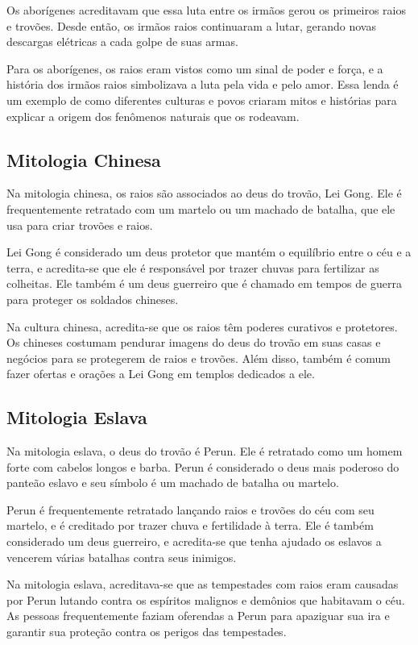 \documentclass[a4paper, 12pt, onecolumn,singlespacing]{article}
\begin{document}
	Os aborígenes acreditavam que essa luta entre os irmãos gerou os primeiros raios e trovões. Desde então, os irmãos raios continuaram a lutar, gerando novas descargas elétricas a cada golpe de suas armas.
	
	Para os aborígenes, os raios eram vistos como um sinal de poder e força, e a história dos irmãos raios simbolizava a luta pela vida e pelo amor. Essa lenda é um exemplo de como diferentes culturas e povos criaram mitos e histórias para explicar a origem dos fenômenos naturais que os rodeavam.
	
	\subsection{Mitologia Chinesa}
	
	Na mitologia chinesa, os raios são associados ao deus do trovão, Lei Gong. Ele é frequentemente retratado com um martelo ou um machado de batalha, que ele usa para criar trovões e raios.
	
	Lei Gong é considerado um deus protetor que mantém o equilíbrio entre o céu e a terra, e acredita-se que ele é responsável por trazer chuvas para fertilizar as colheitas. Ele também é um deus guerreiro que é chamado em tempos de guerra para proteger os soldados chineses.
	
	Na cultura chinesa, acredita-se que os raios têm poderes curativos e protetores. Os chineses costumam pendurar imagens do deus do trovão em suas casas e negócios para se protegerem de raios e trovões. Além disso, também é comum fazer ofertas e orações a Lei Gong em templos dedicados a ele.
	
	\subsection{Mitologia Eslava}
	
	Na mitologia eslava, o deus do trovão é Perun. Ele é retratado como um homem forte com cabelos longos e barba. Perun é considerado o deus mais poderoso do panteão eslavo e seu símbolo é um machado de batalha ou martelo.
	
	Perun é frequentemente retratado lançando raios e trovões do céu com seu martelo, e é creditado por trazer chuva e fertilidade à terra. Ele é também considerado um deus guerreiro, e acredita-se que tenha ajudado os eslavos a vencerem várias batalhas contra seus inimigos.
	
	Na mitologia eslava, acreditava-se que as tempestades com raios eram causadas por Perun lutando contra os espíritos malignos e demônios que habitavam o céu. As pessoas frequentemente faziam oferendas a Perun para apaziguar sua ira e garantir sua proteção contra os perigos das tempestades.
	
\end{document}
